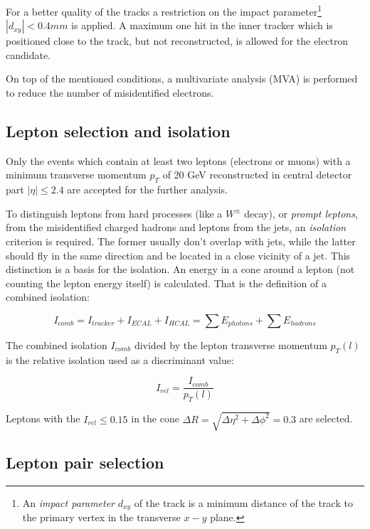For a better quality of the tracks a restriction on the impact parameter\footnote{An \textit{impact parameter} $d_{xy}$ of the track is a minimum
distance of the track to the primary vertex in the transverse $x-y$ plane.} $|d_{xy}| < 0.4 mm$ is applied. A maximum one hit in the inner tracker
which is positioned close to the track, but not reconstructed, is allowed for the electron candidate.

On top of the mentioned conditions, a multivariate analysis (MVA) is performed to reduce the number of misidentified electrons.

\subsection{Lepton selection and isolation}

Only the events which contain at least two leptons (electrons or muons) with a minimum transverse momentum $p_{T}$ of 20 GeV reconstructed
in central detector part $|\eta| \leq 2.4$ are accepted for the further analysis.

To distinguish leptons from hard processes (like a $W^{\pm}$ decay), or \textit{prompt leptons}, from the misidentified charged hadrons 
and leptons from the jets, an \textit{isolation} criterion is required. The former usually don't overlap with jets, while the latter should
fly in the same direction and be located in a close vicinity of a jet. This distinction is a basis for the isolation. An energy in a cone 
around a lepton (not counting the lepton energy itself) is calculated. That is the definition of a combined isolation:

\begin{equation}
 I_{comb} = I_{tracker} + I_{ECAL} + I_{HCAL} = \sum E_{photons} + \sum E_{hadrons}
\end{equation}

The combined isolation $I_{comb}$ divided by the lepton transverse momentum $p_{T}(l)$ is the relative isolation used as a discriminant value:

\begin{equation}
 I_{rel} = \frac{I_{comb}}{p_{T}(l)}
\end{equation}

Leptons with the $I_{rel} \leq 0.15$ in the cone $\Delta R = \sqrt{\Delta\eta^{2} + \Delta\phi^{2}} = 0.3$ are selected.

\subsection{Lepton pair selection}

